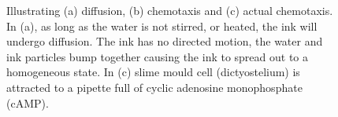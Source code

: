 \begin{figure}[!!!h!!!tb]
\centering
{}
\caption{Illustrating (a) diffusion, (b) chemotaxis and (c) actual chemotaxis. In (a), as long as the water is not stirred, or heated, the ink will undergo diffusion. The ink has no directed motion, the water and ink particles bump together causing the ink to spread out to a homogeneous state. In (c) slime mould cell (dictyostelium) is attracted to a pipette full of cyclic adenosine monophosphate (cAMP). \label{Motion_types}}
\end{figure}


